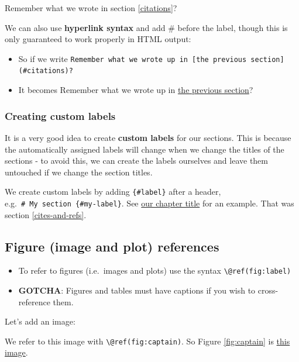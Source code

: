 \documentclass[a4paper, nobind]{templates/ociamthesis}
\providecommand{\tightlist}{%
  \setlength{\itemsep}{0pt}\setlength{\parskip}{0pt}}
\begin{document}
Remember what we wrote in section \ref{citations}?

We can also use \textbf{hyperlink syntax} and add \# before the label, though this is only guaranteed to work properly in HTML output:

\begin{itemize}
\tightlist
\item
  So if we write \texttt{Remember\ what\ we\ wrote\ up\ in\ {[}the\ previous\ section{]}(\#citations)?}
\item
  It becomes Remember what we wrote up in \protect\hyperlink{citations}{the previous section}?
\end{itemize}

\hypertarget{creating-custom-labels-1}{%
\subsubsection{Creating custom labels}\label{creating-custom-labels-1}}

It is a very good idea to create \textbf{custom labels} for our sections. This is because the automatically assigned labels will change when we change the titles of the sections - to avoid this, we can create the labels ourselves and leave them untouched if we change the section titles.

We create custom labels by adding \texttt{\{\#label\}} after a header, e.g.~\texttt{\#\ My\ section\ \{\#my-label\}}.
See \protect\hyperlink{cites-and-refs}{our chapter title} for an example. That was section \ref{cites-and-refs}.

\hypertarget{figure-image-and-plot-references-1}{%
\subsection{Figure (image and plot) references}\label{figure-image-and-plot-references-1}}

\begin{itemize}
\tightlist
\item
  To refer to figures (i.e.~images and plots) use the syntax \texttt{\textbackslash{}@ref(fig:label)}
\item
  \textbf{GOTCHA}: Figures and tables must have captions if you wish to cross-reference them.
\end{itemize}

Let's add an image:

We refer to this image with \texttt{\textbackslash{}@ref(fig:captain)}.
So Figure \ref{fig:captain} is \protect\hyperlink{fig:captain}{this image}.
\end{document}
